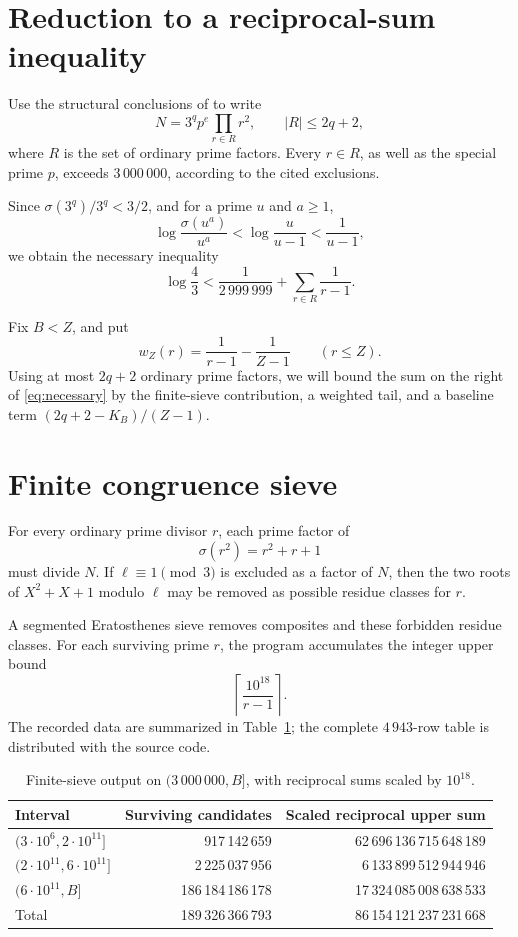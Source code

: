 \documentclass[11pt]{article}
\begin{document}
\section{Reduction to a reciprocal-sum inequality}

Use the structural conclusions of \cite{ochem-zelinsky} to write
\[
N=3^q p^e\prod_{r\in R}r^2,\qquad |R|\le 2q+2,
\]
where \(R\) is the set of ordinary prime factors. Every \(r\in R\), as well as the special prime \(p\), exceeds \(3\,000\,000\), according to the cited exclusions.

Since \(\sigma(3^q)/3^q<3/2\), and for a prime \(u\) and \(a\ge1\),
\[
\log\frac{\sigma(u^a)}{u^a}
<\log\frac{u}{u-1}<\frac1{u-1},
\]
we obtain the necessary inequality
\begin{equation}\label{eq:necessary}
\log\frac43<
\frac1{2\,999\,999}+\sum_{r\in R}\frac1{r-1}.
\end{equation}

Fix \(B<Z\), and put
\[
w_Z(r)=\frac1{r-1}-\frac1{Z-1}\qquad (r\le Z).
\]
Using at most \(2q+2\) ordinary prime factors, we will bound the sum on the right of \eqref{eq:necessary} by the finite-sieve contribution, a weighted tail, and a baseline term \((2q+2-K_B)/(Z-1)\).

\section{Finite congruence sieve}\label{sec:finite}

For every ordinary prime divisor \(r\), each prime factor of
\[
\sigma(r^2)=r^2+r+1
\]
must divide \(N\). If \(\ell\equiv1\pmod3\) is excluded as a factor of \(N\), then the two roots of \(X^2+X+1\) modulo \(\ell\) may be removed as possible residue classes for \(r\).

A segmented Eratosthenes sieve removes composites and these forbidden residue classes. For each surviving prime \(r\), the program accumulates the integer upper bound
\[
\left\lceil \frac{10^{18}}{r-1}\right\rceil .
\]
The recorded data are summarized in Table~\ref{tab:sieve}; the complete \(4\,943\)-row table is distributed with the source code.

\begin{table}[ht]
\centering\small
\caption{Finite-sieve output on \((3\,000\,000,B]\), with reciprocal sums scaled by \(10^{18}\).}
\label{tab:sieve}
\begin{tabular}{@{}lrr@{}}
\toprule
Interval & Surviving candidates & Scaled reciprocal upper sum\\
\midrule
\((3\cdot10^6,2\cdot10^{11}]\) & 917\,142\,659 & 62\,696\,136\,715\,648\,189\\
\((2\cdot10^{11},6\cdot10^{11}]\) & 2\,225\,037\,956 & 6\,133\,899\,512\,944\,946\\
\((6\cdot10^{11},B]\) & 186\,184\,186\,178 & 17\,324\,085\,008\,638\,533\\
\midrule
Total & 189\,326\,366\,793 & 86\,154\,121\,237\,231\,668\\
\bottomrule
\end{tabular}
\end{table}
\end{document}
